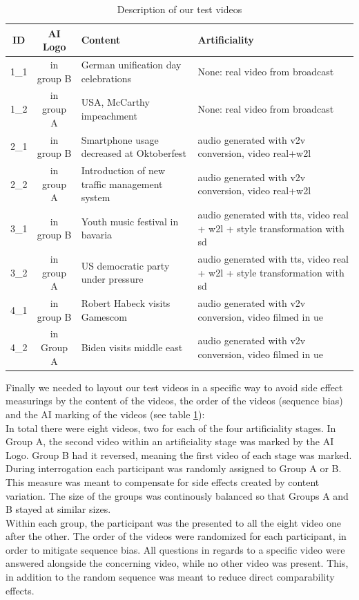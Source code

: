 \documentclass[
  a4paper,  %
  twoside,  %
  bibliography=totoc,
  headsepline,
  cleardoublepage=empty,
  parskip=half,
  draft=false
]{scrbook}
\begin{document}
\begin{table}[h]
  \centering
  \begin{tabularx}{\linewidth}{c|c|X|X}
    
    \textbf{ID} & \textbf{AI Logo} & \textbf{Content} & \textbf{Artificiality}\\
    \midrule
    1\_1 & in group B & German unification day celebrations  & None: real video from broadcast \\
    \midrule
    1\_2 & in group A & USA, McCarthy impeachment  & None: real video from broadcast \\
    \midrule
    2\_1 & in group B & Smartphone usage decreased at Oktoberfest  & audio generated with \gls{v2v} conversion, video real+\gls{w2l} \\
    \midrule
    2\_2 & in group A & Introduction of new traffic management system  & audio generated with \gls{v2v} conversion, video real+\gls{w2l} \\
    \midrule
    3\_1 & in group B & Youth music festival in bavaria  & audio generated with \gls{tts}, video real + \gls{w2l} + style transformation with \gls{sd} \\
    \midrule
    3\_2 & in group A & US democratic party under pressure  & audio generated with \gls{tts}, video real + \gls{w2l} + style transformation with \gls{sd} \\
    \midrule
    4\_1 & in group B & Robert Habeck visits Gamescom  & audio generated with \gls{v2v} conversion, video filmed in \gls{ue} \\
    \midrule
    4\_2 & in Group A & Biden visits middle east  & audio generated with \gls{v2v} conversion, video filmed in \gls{ue} \\
  \end{tabularx}
  \caption{Description of our test videos}
  \label{tab:video-table}
\end{table}

Finally we needed to layout our test videos in a specific way to avoid side effect measurings by the content of the videos, the order of the videos (sequence bias) and the AI marking of the videos (see table \ref{tab:video-table}): \\
In total there were eight videos, two for each of the four artificiality stages. In Group A, the second video within an artificiality stage was marked by the AI Logo. Group B had it reversed, meaning the first video of each stage was marked. \\
During interrogation each participant was randomly assigned to Group A or B. This measure was meant to compensate for side effects created by content variation. The size of the groups was continously balanced so that Groups A and B stayed at similar sizes. \\
Within each group, the participant was the presented to all the eight video one after the other. The order of the videos were randomized for each participant, in order to mitigate sequence bias. All questions in regards to a specific video were answered alongside the concerning video, while no other video was present. This, in addition to the random sequence was meant to reduce direct comparability effects.
\end{document}
